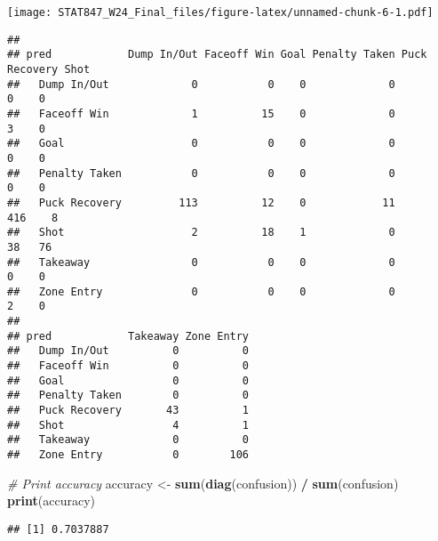 \documentclass[
  a3paper,
]{article}
\newenvironment{Shaded}{\begin{snugshade}}{\end{snugshade}}
\newcommand{\CommentTok}[1]{\textcolor[rgb]{0.56,0.35,0.01}{\textit{#1}}}
\newcommand{\FunctionTok}[1]{\textcolor[rgb]{0.13,0.29,0.53}{\textbf{#1}}}
\newcommand{\NormalTok}[1]{#1}
\newcommand{\OtherTok}[1]{\textcolor[rgb]{0.56,0.35,0.01}{#1}}
\newcommand{\SpecialCharTok}[1]{\textcolor[rgb]{0.81,0.36,0.00}{\textbf{#1}}}
\newcommand{\StringTok}[1]{\textcolor[rgb]{0.31,0.60,0.02}{#1}}
\begin{document}
\texttt{[image: STAT847\_W24\_Final\_files/figure-latex/unnamed-chunk-6-1.pdf]}

\begin{Shaded}
\end{Shaded}

\begin{verbatim}
##                
## pred            Dump In/Out Faceoff Win Goal Penalty Taken Puck Recovery Shot
##   Dump In/Out             0           0    0             0             0    0
##   Faceoff Win             1          15    0             0             3    0
##   Goal                    0           0    0             0             0    0
##   Penalty Taken           0           0    0             0             0    0
##   Puck Recovery         113          12    0            11           416    8
##   Shot                    2          18    1             0            38   76
##   Takeaway                0           0    0             0             0    0
##   Zone Entry              0           0    0             0             2    0
##                
## pred            Takeaway Zone Entry
##   Dump In/Out          0          0
##   Faceoff Win          0          0
##   Goal                 0          0
##   Penalty Taken        0          0
##   Puck Recovery       43          1
##   Shot                 4          1
##   Takeaway             0          0
##   Zone Entry           0        106
\end{verbatim}

\begin{Shaded}
\begin{Highlighting}[]
\CommentTok{\# Print accuracy}
\NormalTok{accuracy }\OtherTok{\textless{}{-}} \FunctionTok{sum}\NormalTok{(}\FunctionTok{diag}\NormalTok{(confusion)) }\SpecialCharTok{/} \FunctionTok{sum}\NormalTok{(confusion)}
\FunctionTok{print}\NormalTok{(accuracy)}
\end{Highlighting}
\end{Shaded}

\begin{verbatim}
## [1] 0.7037887
\end{verbatim}
\end{document}
